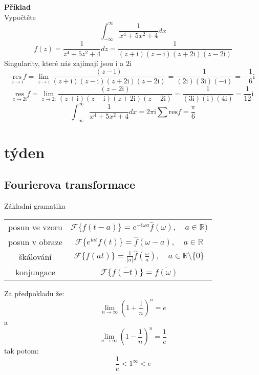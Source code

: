 \documentclass{article}
\newcommand{\mi}{\mathrm{i}}
\newcommand{\res}{\mathrm{res}}
\begin{document}
    {\bf Příklad}
    \\
    Vypočtěte
        \[\int_{-\infty}^{\infty}\frac{1}{x^4+5x^2+4}dx\]
        \[f(z)=\frac{1}{z^4+5z^2+4}dz=\frac{1}{(z+\mi)(z-\mi)(z+2\mi)(z-2\mi)}\]
        Singularity, které nás zajímají jsou $\mi$ a $2\mi$
        \[\underset{z\to\mi}{\res}f=\lim_{z\to\mi}\frac{(z-\mi)}{(z+\mi)(z-\mi)(z+2\mi)(z-2\mi)}=\frac{1}{(2\mi)(3\mi)(-\mi)}=-\frac{1}{6}\mi\]
        \[\underset{z\to2\mi}{\res}f=\lim_{z\to2\mi}\frac{(z-2\mi)}{(z+\mi)(z-\mi)(z+2\mi)(z-2\mi)}=\frac{1}{(3\mi)(\mi)(4\mi)}=\frac{1}{12}\mi\]
        \[\int_{-\infty}^{\infty}\frac{1}{x^4+5x^2+4}dx=2\pi\mi\sum \res f=\frac{\pi}{6}\]
    \section{týden}%
        \subsection{Fourierova transformace}
        Základní gramatika
        \begin{center}
            \begin{tabular}{|c|c|}
                \hline
                posun ve vzoru& $\mathcal{F}\{f(t-a)\}=e^{-\mi\omega a}\hat{f}(\omega),\quad a\in\mathbb{R})$ \\
                posun v obraze&  $\mathcal{F}\{e^{\mi at}f(t)\}=\hat{f}(\omega-a), \quad a\in \mathbb{R}$\\
                škálování& $\mathcal{F}\{f(at)\}=\frac{1}{|a|}\hat{f}\left(\frac{\omega}{a}\right),\quad a\in\mathbb{R}\setminus\{0\}$\\
                konjungace& $\mathcal{F}\{\overline{f(-t)}\}=\overline{f(\omega)}$ \\
                \hline
            \end{tabular}
        \end{center}


Za předpokladu že:
\[\lim_{n\to\infty}\left(1+\frac{1}{n}\right)^n=e\]
a
\[\lim_{n\to\infty}\left(1-\frac{1}{n}\right)^n=\frac{1}{e}\]
tak potom:
\[\frac{1}{e}<1^{\infty}<e\]
\end{document}

